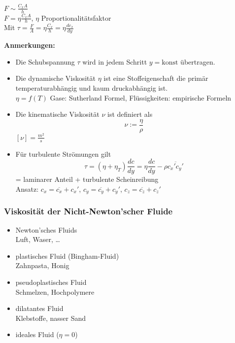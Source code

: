 \documentclass[10pt,a4paper]{article}
\begin{document}

$F \sim \frac{C_x A}{h}$ \\
$F = \eta \frac{C_x A}{h}$, $\eta$ Proportionalitätsfaktor \\
Mit $\tau = \frac{F}{A} = \eta \frac{C_x}{h} = \eta \frac{d c_x}{d y}$


\textbf{Anmerkungen:}
\begin{itemize}
\item Die Schubspannung $\tau$ wird in jedem Schritt $y = \text{konst}$ übertragen.
\item Die dynamische Viskosität $\eta$ ist eine Stoffeigenschaft die primär temperaturabhängig und kaum druckabhängig ist. \\
$\eta = f(T)$ Gase: Sutherland Formel, Flüssigkeiten: empirische Formeln
\item Die kinematische Viskosität $\nu$ ist definiert als
\[\nu := \frac{\eta}{\rho}\]
$[\nu] = \frac{m^2}{s}$
\item Für turbulente Strömungen gilt
\[ \tau = (\eta + \eta_T) \frac{dc}{dy} = \eta \frac{dc}{dy} - \rho \overline{c_x' c_y'} \]
= laminarer Anteil + turbulente Scheinreibung \\ %
Ansatz: $c_x = \overline{c_x} + c_x'$, $c_y = \overline{c_y} + c_y'$, $c_z = \overline{c_z} + c_z'$
\end{itemize}

\subsubsection{Viskosität der Nicht-Newton'scher Fluide}

\begin{itemize}
\item Newton'sches Fluids \\ Luft, Waser, \dots
\item plastisches Fluid (Bingham-Fluid) \\ Zahnpasta, Honig
\item pseudoplastisches Fluid \\ Schmelzen, Hochpolymere
\item dilatantes Fluid \\ Klebstoffe, nasser Sand
\item ideales Fluid ($\eta = 0$)
\end{itemize}
\end{document}
